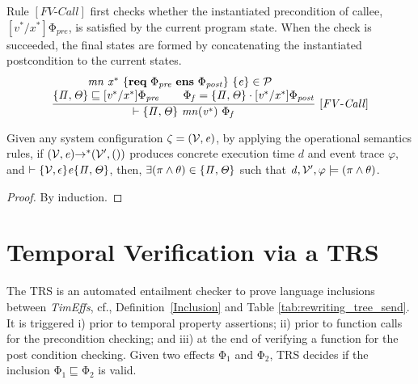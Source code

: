 \documentclass[acmsmall,10pt,review]{acmart}
\newcommand{\env}{\code{\mathcal{V}}}
\newcommand{\es}{\theta}
\newcommand{\timedEffects}{\emph{TimEffs}}
\newcommand{\effect}{{\ensuremath{\mathrm{\Phi}}}}
\newcommand{\code}[1]{{\tt{\ensuremath{\m{#1}}}}}
\newcommand{\CONTAIN}{\sqsubseteq}
\newcommand{\m}{\mathit}
\newcommand\tabref[1]{Table \textcolor{black}{\ref{#1}}.}
\newcommand\appref[1]{Appendix~\textcolor{blue}{\ref{#1}}}
\newcommand\defref[1]{Definition~\textcolor{blue}{\ref{#1}}}
\begin{document}
{  \vspace{1mm}
Rule \code{[FV\text{-}Call]} first checks whether the instantiated 
  precondition of callee, \code{[v^*/x^*]\effect_{pre}}, is satisfied by 
  the current program state. When the check is succeeded, the final states are 
  formed by concatenating the  
  instantiated postcondition to the current states. 
{{\small\begin{gather*}
\code{\frac{
\begin{matrix}
{\code{  mn  \ {x^*}\ \{\textbf{req}\ \effect_{pre}\ \textbf{ens}\  \effect_{post}\} \ \{ e \} \in \mathcal{P}\ \ }}
\\
\text{\code{ \s{ \Pi, \Theta} \CONTAIN [v^*/x^*] \effect_{pre}   
\qquad   \effect_f =  \s{ \Pi, \Theta} \cdot  [v^*/x^*]\effect_{post}}}
\end{matrix}}
{\vdash \s{ \Pi, \Theta} \ mn({v^*})  \ 
\effect_f} \ {[FV\text{-}Call]}}
\end{gather*}}}


\begin{theorem}\label{Soundness_forward_rules}
  Given any system configuration \code{\zeta = (\env, e)}, by applying the operational
  semantics rules, 
  if \code{(\env, e) {\rightarrow^*} (\env^\prime, ())} produces concrete 
  execution time \code{d} and event trace \code{\varphi}, and \code{ \vdash  
  \s{\env, \epsilon} e \s{\Pi, \Theta}}, then, 
  \code{\exists (\pi\wedge \es) \in \s{\Pi, \Theta} } such that 
  \code{d, \env^\prime, \varphi  \models (\pi\wedge \es)}. 

  \end{theorem}
  
  
  \begin{proof}
    By induction. 
  \end{proof}


\section{Temporal Verification via a TRS}
\label{sec:Entailment_Prover}


The TRS  is an automated entailment checker to prove language 
inclusions between \timedEffects, cf., \defref{Inclusion} and 
\tabref{tab:rewriting_tree_send} It is triggered i) prior to 
temporal property assertions; ii) prior to function calls for the 
precondition checking; and iii) at the end of verifying a function 
for the post condition checking. Given two effects 
\code{\effect_1} and \code{\effect_2}, TRS decides if the inclusion \code{\effect_1 \CONTAIN  \effect_2 } is valid. 

}
\end{document}
